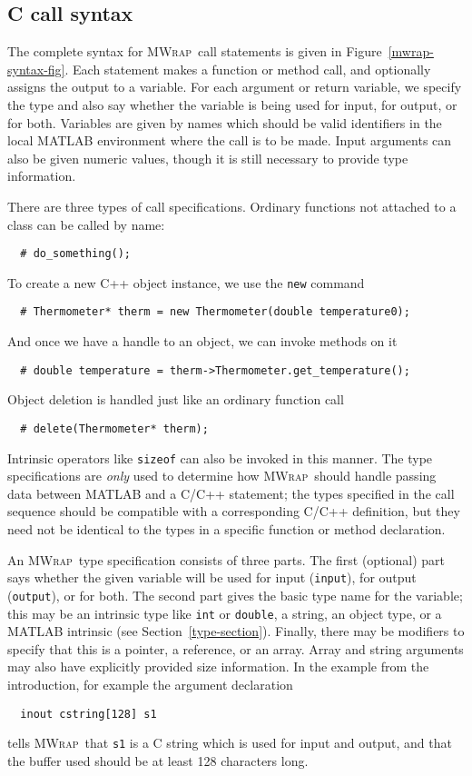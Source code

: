 \documentclass[12pt]{article}
\newcommand{\mwrap}{\textsc{MWrap}}
\begin{document}
\subsection{C call syntax}

The complete syntax for \mwrap\ call statements is given in
Figure~\ref{mwrap-syntax-fig}.  Each statement makes a function or
method call, and optionally assigns the output to a variable.  For
each argument or return variable, we specify the type and also say
whether the variable is being used for input, for output, or for both.
Variables are given by names which should be valid identifiers in the
local MATLAB environment where the call is to be made.  Input
arguments can also be given numeric values, though it is still necessary
to provide type information.

There are three types of call specifications.  Ordinary functions
not attached to a class can be called by name:
\begin{verbatim}
  # do_something();
\end{verbatim}
To create a new C++ object instance, we use the {\tt new} command
\begin{verbatim}
  # Thermometer* therm = new Thermometer(double temperature0);
\end{verbatim}
And once we have a handle to an object, we can invoke methods on it
\begin{verbatim}
  # double temperature = therm->Thermometer.get_temperature();
\end{verbatim}
Object deletion is handled just like an ordinary function call
\begin{verbatim}
  # delete(Thermometer* therm);
\end{verbatim}
Intrinsic operators like {\tt sizeof} can also be invoked in this manner.
The type specifications are \emph{only} used to determine how \mwrap\
should handle passing data between MATLAB and a C/C++ statement;
the types specified in the call sequence should be compatible with 
a corresponding C/C++ definition, but they need not be identical to the
types in a specific function or method declaration.

An \mwrap\ type specification consists of three parts.  The first
(optional) part says whether the given variable will be used for input
({\tt input}), for output ({\tt output}), or for both.  The second
part gives the basic type name for the variable; this may be an
intrinsic type like {\tt int} or {\tt double}, a string, an object
type, or a MATLAB intrinsic (see Section~\ref{type-section}).
Finally, there may be modifiers to specify that this is a pointer, a
reference, or an array.  Array and string arguments may also have
explicitly provided size information.  In the example from the
introduction, for example the argument declaration
\begin{verbatim}
  inout cstring[128] s1
\end{verbatim}
tells \mwrap\ that {\tt s1} is a C string which is used for input and output,
and that the buffer used should be at least 128 characters long.
\end{document}
